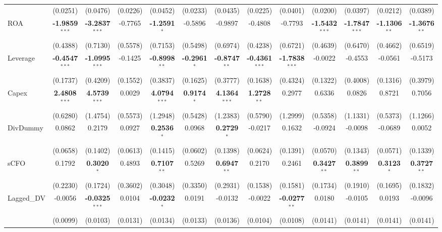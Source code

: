 \documentclass[11pt,a4paper]{article}
\begin{document}
\begin{table}[htbp]
\begin{tabular}{lcccccccccccc}
 & (0.0251) & (0.0476) & (0.0226) & (0.0452) & (0.0233) & (0.0435) & (0.0225) & (0.0401) & (0.0200) & (0.0397) & (0.0212) & (0.0389) \\
ROA & \textbf{-1.9859}$^{***}$ & \textbf{-3.2837}$^{***}$ & -0.7765 & \textbf{-1.2591}$^{*}$ & -0.5896 & -0.9897 & -0.4808 & -0.7793 & \textbf{-1.5432}$^{***}$ & \textbf{-1.7847}$^{***}$ & \textbf{-1.1306}$^{**}$ & \textbf{-1.3676}$^{**}$ \\
 & (0.4388) & (0.7130) & (0.5578) & (0.7153) & (0.5498) & (0.6974) & (0.4238) & (0.6721) & (0.4639) & (0.6470) & (0.4662) & (0.6519) \\
Leverage & \textbf{-0.4547}$^{***}$ & \textbf{-1.0995}$^{***}$ & -0.1425 & \textbf{-0.8998}$^{**}$ & \textbf{-0.2961}$^{*}$ & \textbf{-0.8747}$^{**}$ & \textbf{-0.4361}$^{***}$ & \textbf{-1.7838}$^{***}$ & -0.0022 & -0.4553 & -0.0561 & -0.5173 \\
 & (0.1737) & (0.4209) & (0.1552) & (0.3837) & (0.1625) & (0.3777) & (0.1638) & (0.4324) & (0.1322) & (0.4008) & (0.1316) & (0.3979) \\
Capex & \textbf{2.4808}$^{***}$ & \textbf{4.5739}$^{***}$ & 0.0029 & \textbf{4.0794}$^{***}$ & \textbf{0.9174}$^{*}$ & \textbf{4.1364}$^{***}$ & \textbf{1.2728}$^{**}$ & 0.2977 & 0.6336 & 0.0826 & 0.8721 & 0.7056 \\
 & (0.6280) & (1.4754) & (0.5573) & (1.2948) & (0.5428) & (1.2383) & (0.5790) & (1.2999) & (0.5358) & (1.1331) & (0.5373) & (1.1266) \\
DivDummy & 0.0862 & 0.2179 & 0.0927 & \textbf{0.2536}$^{*}$ & 0.0968 & \textbf{0.2729}$^{*}$ & -0.0217 & 0.1632 & -0.0924 & -0.0098 & -0.0689 & 0.0052 \\
 & (0.0658) & (0.1402) & (0.0613) & (0.1415) & (0.0602) & (0.1398) & (0.0624) & (0.1391) & (0.0570) & (0.1343) & (0.0571) & (0.1339) \\
sCFO & 0.1792 & \textbf{0.3020}$^{*}$ & 0.4893 & \textbf{0.7107}$^{**}$ & 0.5269 & \textbf{0.6947}$^{**}$ & 0.2170 & 0.2461 & \textbf{0.3427}$^{**}$ & \textbf{0.3899}$^{**}$ & \textbf{0.3123}$^{*}$ & \textbf{0.3727}$^{**}$ \\
 & (0.2230) & (0.1724) & (0.3602) & (0.3048) & (0.3350) & (0.2931) & (0.1538) & (0.1581) & (0.1734) & (0.1910) & (0.1695) & (0.1832) \\
Lagged\_DV & -0.0056 & \textbf{-0.0325}$^{***}$ & 0.0104 & \textbf{-0.0232}$^{*}$ & 0.0191 & -0.0132 & -0.0022 & \textbf{-0.0277}$^{**}$ & 0.0180 & -0.0105 & 0.0193 & -0.0096 \\
 & (0.0099) & (0.0103) & (0.0131) & (0.0134) & (0.0133) & (0.0136) & (0.0104) & (0.0108) & (0.0141) & (0.0141) & (0.0141) & (0.0141) \\

\end{tabular}
\end{table}
\end{document}
